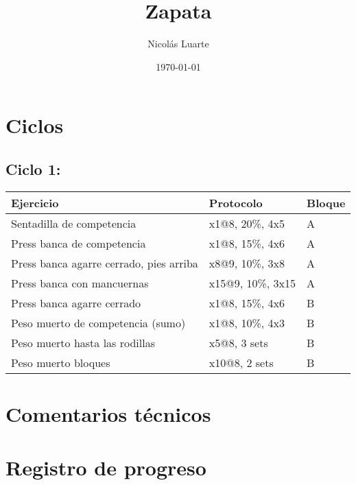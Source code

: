 \documentclass[11pt]{article}
\author{Nicolás Luarte}
\date{\today}
\title{Zapata}
\begin{document}
\maketitle
\tableofcontents

\section{Ciclos}
\label{sec:org881f725}
\subsection{Ciclo 1:}
\label{sec:orgebc91bc}
\begin{center}
\begin{tabular}{lll}
Ejercicio & Protocolo & Bloque\\
\hline
Sentadilla de competencia & x1@8, 20\%, 4x5 & A\\
Press banca de competencia & x1@8, 15\%, 4x6 & A\\
Press banca agarre cerrado, pies arriba & x8@9, 10\%, 3x8 & A\\
Press banca con mancuernas & x15@9, 10\%, 3x15 & A\\
\hline
Press banca agarre cerrado & x1@8, 15\%, 4x6 & B\\
Peso muerto de competencia (sumo) & x1@8, 10\%, 4x3 & B\\
Peso muerto hasta las rodillas & x5@8, 3 sets & B\\
Peso muerto bloques & x10@8, 2 sets & B\\
\hline
\end{tabular}
\end{center}

\section{Comentarios técnicos}
\label{sec:orgaabf6eb}
\section{Registro de progreso}
\label{sec:org002ddf0}
\end{document}
